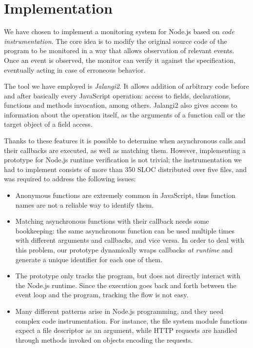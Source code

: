 \section{Implementation}
\label{sec:impl}
We have chosen to implement a monitoring system for Node.js based on \emph{code instrumentation}.
The core idea is to modify the original source code of the program to be monitored in a way that allows observation of relevant events.
Once an event is observed, the monitor can verify it against the specification, eventually acting in case of erroneous behavior.

The tool we have employed is \emph{Jalangi2}.
It allows addition of arbitrary code before and after basically every JavaScript operation: access to fields, declarations, functions and methods invocation, among others. Jalangi2 also gives access to information about the operation itself, as the arguments of a function call or the target object of a field access.

Thanks to these features it is possible to determine when asynchronous calls and their callbacks are executed, as well as matching them.
However, implementing a prototype for Node.js runtime verification is not trivial; the instrumentation we had to implement
consists of more than 350 SLOC distributed over five files, and was required to address the following issues:
\begin{itemize}
\item Anonymous functions are extremely common in JavaScript, thus function names are not a reliable way to identify them.
\item Matching asynchronous functions with their callback needs some bookkeeping: the same asynchronous function can be used multiple times with different arguments and callbacks, and vice versa.
In order to deal with this problem, our prototype dynamically wraps callbacks \emph{at runtime} and generate a unique identifier for each one of them.
\item The prototype only tracks the program, but does not directly interact with the Node.js runtime.
Since the execution goes back and forth between the event loop and the program, tracking the flow is not easy.
\item Many different patterns arise in Node.js programming, and they need complex code instrumentation.
For instance, the file system module functions expect a file descriptor as an argument, while HTTP requests are handled through methods invoked on objects encoding the requests.
\end{itemize}

